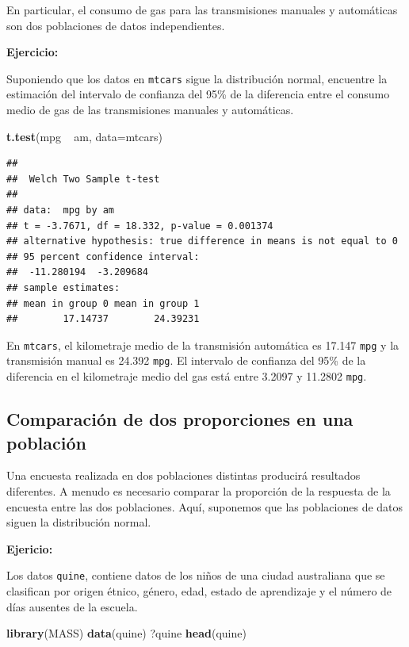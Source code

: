 \documentclass[]{article}
\newenvironment{Shaded}{\begin{snugshade}}{\end{snugshade}}
\newcommand{\KeywordTok}[1]{\textcolor[rgb]{0.13,0.29,0.53}{\textbf{{#1}}}}
\newcommand{\DataTypeTok}[1]{\textcolor[rgb]{0.13,0.29,0.53}{{#1}}}
\newcommand{\StringTok}[1]{\textcolor[rgb]{0.31,0.60,0.02}{{#1}}}
\newcommand{\NormalTok}[1]{{#1}}
\numberwithin{equation}{section}
\begin{document}
En particular, el consumo de gas para las transmisiones manuales y
automáticas son dos poblaciones de datos independientes.

\textbf{Ejercicio:}

Suponiendo que los datos en \texttt{mtcars} sigue la distribución
normal, encuentre la estimación del intervalo de confianza del 95\% de
la diferencia entre el consumo medio de gas de las transmisiones
manuales y automáticas.

\begin{Shaded}
\begin{Highlighting}[]
\KeywordTok{t.test}\NormalTok{(mpg ~}\StringTok{ }\NormalTok{am, }\DataTypeTok{data=}\NormalTok{mtcars) }
\end{Highlighting}
\end{Shaded}

\begin{verbatim}
## 
##  Welch Two Sample t-test
## 
## data:  mpg by am
## t = -3.7671, df = 18.332, p-value = 0.001374
## alternative hypothesis: true difference in means is not equal to 0
## 95 percent confidence interval:
##  -11.280194  -3.209684
## sample estimates:
## mean in group 0 mean in group 1 
##        17.14737        24.39231
\end{verbatim}

En \texttt{mtcars}, el kilometraje medio de la transmisión automática es
17.147 \texttt{mpg} y la transmisión manual es 24.392 \texttt{mpg}. El
intervalo de confianza del 95\% de la diferencia en el kilometraje medio
del gas está entre 3.2097 y 11.2802 \texttt{mpg}.

\subsection{Comparación de dos proporciones en una
población}\label{comparacion-de-dos-proporciones-en-una-poblacion}

Una encuesta realizada en dos poblaciones distintas producirá resultados
diferentes. A menudo es necesario comparar la proporción de la respuesta
de la encuesta entre las dos poblaciones. Aquí, suponemos que las
poblaciones de datos siguen la distribución normal.

\textbf{Ejericio:}

Los datos \texttt{quine}, contiene datos de los niños de una ciudad
australiana que se clasifican por origen étnico, género, edad, estado de
aprendizaje y el número de días ausentes de la escuela.

\begin{Shaded}
\begin{Highlighting}[]
\KeywordTok{library}\NormalTok{(MASS)}
\KeywordTok{data}\NormalTok{(quine)}
\NormalTok{?quine}
\KeywordTok{head}\NormalTok{(quine)}
\end{Highlighting}
\end{Shaded}
\end{document}
